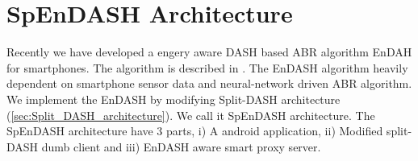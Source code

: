 

\section{SpEnDASH Architecture}
Recently we have developed a engery aware DASH based ABR algorithm EnDAH for smartphones. The algorithm is described in . The EnDASH algorithm heavily dependent on smartphone sensor data and neural-network driven ABR algorithm. We implement the EnDASH by modifying Split-DASH architecture (\ref{sec:Split_DASH_architecture}). We call it SpEnDASH architecture. The SpEnDASH architecture have 3 parts, i) A android application, ii) Modified split-DASH dumb client and iii) EnDASH aware smart proxy server.